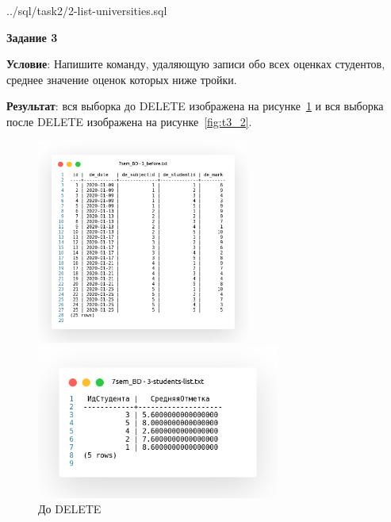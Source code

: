 
{../sql/task2/2-list-universities.sql}

\newpage

\begin{center}
  \textbf{Задание 3}
\end{center}

\textbf{Условие}:
Напишите команду, удаляющую записи обо всех оценках студентов,
среднее значение оценок которых ниже тройки.



\textbf{Результат}: вся выборка до DELETE изображена на рисунке~\ref{fig:t3_1}
и вся выборка после DELETE изображена на рисунке~\ref{fig:t3_2}.

\begin{figure}[!h]
  \centering

  \begin{minipage}{0.49\textwidth}
    \centering

    \includegraphics[width=7cm]
    {../sql/task3/3_before.png}

    \caption{До DELETE}
    \label{fig:t3_1}
  \end{minipage}
  \begin{minipage}{0.49\textwidth}
    \centering

    \includegraphics[width=8cm]
    {../sql/task3/3-students-list.png}


\end{minipage}
\end{figure}
